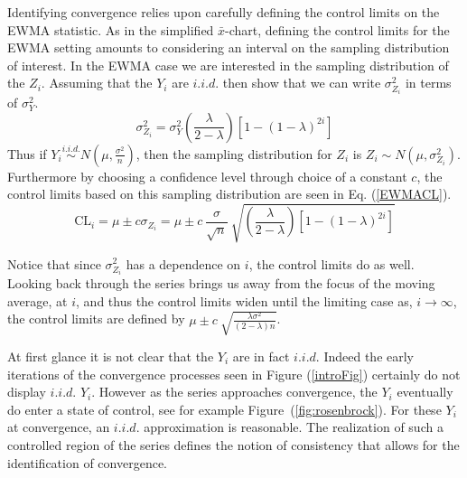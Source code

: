 \documentclass[12pt]{article}
\begin{document}
%
%

%
Identifying convergence relies upon carefully defining the control limits on the EWMA statistic.
%
As in the simplified $\bar x$-chart, defining the control limits for the EWMA setting amounts to considering an interval on the sampling distribution of interest.
In the EWMA case we are interested in the sampling distribution of the $Z_i$.
Assuming that the $Y_i$ are $i.i.d.$ then \cite{ewmaPaper} show that we can write $\sigma^2_{Z_i}$ in terms of $\sigma^2_{Y}$. 
%
\begin{equation}
\sigma^2_{Z_i} = \sigma^2_{Y}\left(\frac{\lambda}{2-\lambda}\right)\left[1-(1-\lambda)^{2i}\right]
\end{equation}
Thus if $Y_i \stackrel{i.i.d.}{\sim} N\left(\mu, \frac{\sigma^2}{n}\right)$, then the sampling distribution for $Z_i$ is $Z_i \sim N\left(\mu, \sigma^2_{Z_i}\right)$.
%
Furthermore by choosing a confidence level through choice of a constant $c$, the control limits based on this sampling distribution are seen in Eq. (\ref{EWMACL}).%
%
%
%
\begin{equation}
\text{CL}_i = \mu \pm c \sigma_{Z_i}
=  \mu \pm c ~ \frac{\sigma}{\sqrt{n}}~\sqrt{\left(\frac{\lambda}{2-\lambda}\right)\left[1-(1-\lambda)^{2i}\right]}
\label{EWMACL}
\end{equation}
%
%

%
Notice that since $\sigma^2_{Z_i}$ has a dependence on $i$, the control limits do as well.
Looking back through the series brings us away from the focus of the moving average, at $i$, and thus the control limits widen until the limiting case as, $i\rightarrow\infty$, the control limits are defined by $\mu \pm c ~ \sqrt{\frac{\lambda\sigma^2}{(2-\lambda)n}}$.

%
At first glance it is not clear that the $Y_i$ are in fact $i.i.d.$
%
Indeed the early iterations of the convergence processes seen in Figure (\ref{introFig}) certainly do not display $i.i.d.$ $Y_i$. 
%
However as the series approaches convergence, the $Y_i$ eventually do enter a state of control, see for example Figure~(\ref{fig:rosenbrock}).
%
For these $Y_i$ at convergence, an $i.i.d.$ approximation is reasonable.
%
The realization of such a controlled region of the series defines the notion of consistency that allows for the identification of convergence. 
\end{document}
